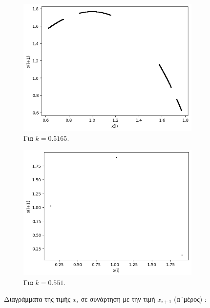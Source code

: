 \begin{figure}[h!]
\begin{subfigure}[b]{0.4\textwidth}
		\includegraphics[width=\textwidth]{LateX images/graphs q03/g67}
		\caption{Για $k=0.5165$.}
		\label{f:k19}
	\end{subfigure}
	\hfill
	\begin{subfigure}[b]{0.4\textwidth}
		\centering
		\includegraphics[width=\textwidth]{LateX images/graphs q03/g8}
		\caption{Για $k=0.551$.}
		\label{f:k20}
	\end{subfigure}
	\hfill
\caption{Διαγράμματα της τιμής \(x_i\) σε συνάρτηση με την τιμή \(x_{i+1}\) (α´μέρος) :}	
\end{figure}
